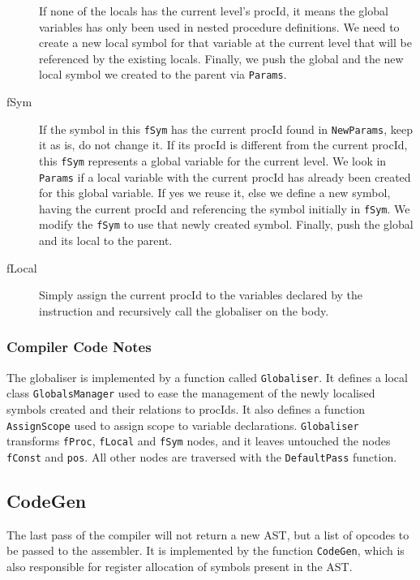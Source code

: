 \documentclass[a4paper]{memoir}
\begin{document}
\begin{description}
      If none of the locals has the current level's procId, it means the global variables has only been used in nested procedure definitions. We need to create a new local symbol for that variable at the current level that will be referenced by the existing locals. Finally, we push the global and the new local symbol we created to the parent via \lstinline!Params!. 
   \item[fSym] If the symbol in this \lstinline!fSym! has the current procId found in \lstinline!NewParams!, keep it as is, do not change it.  If its procId is different from the current procId, this \lstinline!fSym! represents a global variable for the current level. We look in \lstinline!Params! if a local variable with the current procId has already been created for this global variable. If yes we reuse it, else we define a new symbol, having the current procId and referencing the symbol initially in \lstinline!fSym!. We modify the \lstinline!fSym! to use that newly created symbol. Finally, push the global and its local to the parent.
   \item[fLocal] Simply assign the current procId to the variables declared by the instruction and recursively call the globaliser on the body.
\end{description}

\subsubsection{Compiler Code Notes}
The globaliser is implemented by a function called \lstinline!Globaliser!. It
defines a local class \lstinline!GlobalsManager! used to ease the management of
the newly localised symbols created and their relations to procIds. It also
defines a function \lstinline!AssignScope! used to assign scope to variable
declarations. \lstinline!Globaliser! transforms \lstinline!fProc!,
\lstinline!fLocal! and \lstinline!fSym! nodes, and it leaves untouched the nodes
\lstinline!fConst! and \lstinline!pos!. All other nodes are traversed with the
\lstinline!DefaultPass! function.

\subsection{CodeGen}\label{sec:arch:codegen}
The last pass of the compiler will not return a new AST, but a list of opcodes to be passed to the assembler. It is implemented by the function \lstinline!CodeGen!, which is also responsible for register allocation of symbols present in the AST.
\end{document}
